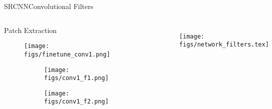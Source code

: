 \begin{frame}{SRCNN}{Convolutional Filters}
    \begin{columns}
        \begin{block}{Patch Extraction}
        \begin{figure}
            \texttt{[image: figs/finetune\_conv1.png]}
        \end{figure}

        \begin{figure}[H]
            \centering
            \begin{subfigure}[b]{0.40\textwidth}
            \centering
                \texttt{[image: figs/conv1\_f1.png]}
            \end{subfigure}
        \quad
            \begin{subfigure}[b]{0.40\textwidth}
            \centering
                \texttt{[image: figs/conv1\_f2.png]}
            \end{subfigure}
        \end{figure}
    \end{block} 
        \begin{figure}
            \texttt{[image: figs/network\_filters.tex]}
        \end{figure}
\end{columns}
\end{frame}

